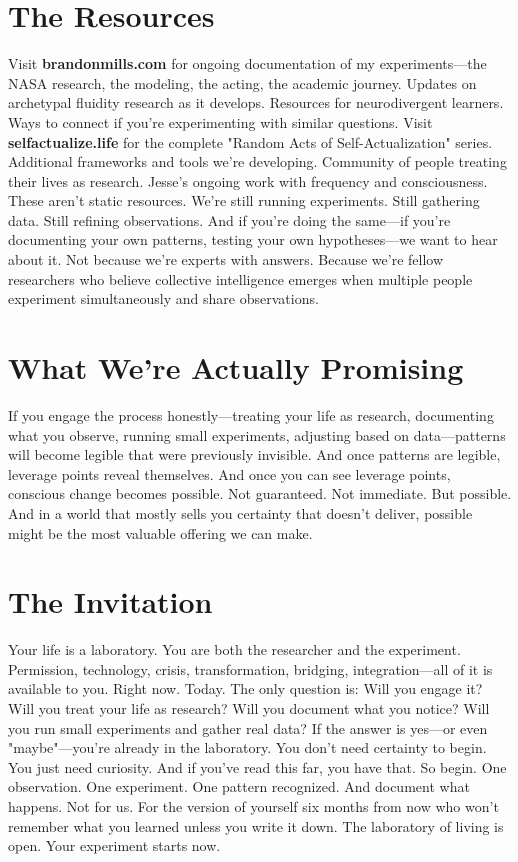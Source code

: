\section{The Resources}

Visit \textbf{brandonmills.com} for ongoing documentation of my experiments—the NASA research, the modeling, the acting, the academic journey. Updates on archetypal fluidity research as it develops. Resources for neurodivergent learners. Ways to connect if you're experimenting with similar questions.
Visit \textbf{selfactualize.life} for the complete "Random Acts of Self-Actualization" series. Additional frameworks and tools we're developing. Community of people treating their lives as research. Jesse's ongoing work with frequency and consciousness.
These aren't static resources. We're still running experiments. Still gathering data. Still refining observations.
And if you're doing the same—if you're documenting your own patterns, testing your own hypotheses—we want to hear about it.
Not because we're experts with answers. Because we're fellow researchers who believe collective intelligence emerges when multiple people experiment simultaneously and share observations.

\section{What We're Actually Promising}

If you engage the process honestly—treating your life as research, documenting what you observe, running small experiments, adjusting based on data—patterns will become legible that were previously invisible.
And once patterns are legible, leverage points reveal themselves.
And once you can see leverage points, conscious change becomes possible.
Not guaranteed. Not immediate. But possible.
And in a world that mostly sells you certainty that doesn't deliver, possible might be the most valuable offering we can make.

\section{The Invitation}

Your life is a laboratory. You are both the researcher and the experiment.
Permission, technology, crisis, transformation, bridging, integration—all of it is available to you. Right now. Today.
The only question is: Will you engage it?
Will you treat your life as research? Will you document what you notice? Will you run small experiments and gather real data?
If the answer is yes—or even "maybe"—you're already in the laboratory.
You don't need certainty to begin. You just need curiosity. And if you've read this far, you have that.
So begin. One observation. One experiment. One pattern recognized.
And document what happens. Not for us. For the version of yourself six months from now who won't remember what you learned unless you write it down.
The laboratory of living is open.
Your experiment starts now.

